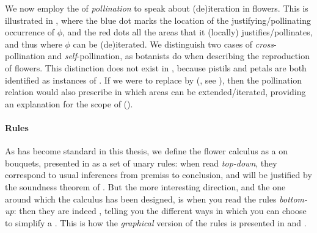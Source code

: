 \begin{scope}
We now employ the  of \emph{pollination} to speak about (de)iteration in
flowers. This is illustrated in , where the blue dot marks
the location of the justifying/pollinating occurrence of $\phi$, and the red
dots all the areas that it (locally) justifies/pollinates, and thus where $\phi$
can be (de)iterated. We distinguish two cases of
\emph{cross}-pollination and \emph{self}-pollination, as botanists do when
describing the reproduction of flowers. This distinction does not exist in
 , because pistils and petals are both identified as
instances of . If we were to replace
 by  (, see ), then the pollination
relation would also prescribe in which areas  can be extended/iterated,
providing an explanation for the scope of  ().

\paragraph{Rules}

As has become standard in this thesis, we define the flower calculus as a
\emph{} on bouquets, presented in  as a
set of unary  rules: when read \emph{top-down}, they correspond to
usual inferences from premiss to conclusion, and will be justified by the
soundness theorem of .
But the more interesting direction, and the one around which the calculus has
been designed, is when you read the rules \emph{bottom-up}: then they are indeed
, telling you the different ways in which you can choose to
simplify a . This is how the \emph{graphical} version of the rules is
presented in  and .


\end{scope}
